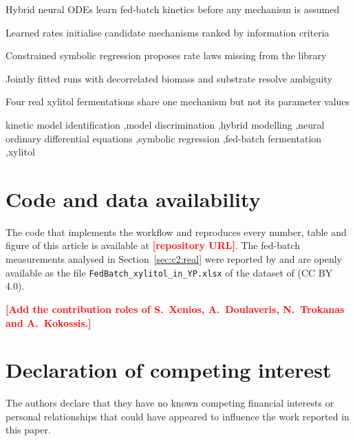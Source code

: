 \documentclass[a4paper,fleqn]{cas-dc}
\newcommand{\todo}[1]{\textcolor{red}{\textbf{[#1]}}}
\begin{document}
\begin{highlights}
\item Hybrid neural ODEs learn fed-batch kinetics before any mechanism is assumed
\item Learned rates initialise candidate mechanisms ranked by information criteria
\item Constrained symbolic regression proposes rate laws missing from the library
\item Jointly fitted runs with decorrelated biomass and substrate resolve ambiguity
\item Four real xylitol fermentations share one mechanism but not its parameter values
\end{highlights}

\begin{keywords}
kinetic model identification \sep model discrimination \sep hybrid modelling \sep neural ordinary differential equations \sep symbolic regression \sep fed-batch fermentation \sep xylitol
\end{keywords}

\maketitle









\section*{Code and data availability}
The code that implements the workflow and reproduces every number, table and figure of this article is available at \todo{repository URL}. The fed-batch measurements analysed in Section~\ref{sec:c2:real} were reported by \citet{Toivari2025} and are openly available as the file \texttt{FedBatch\_xylitol\_in\_YP.xlsx} of the dataset of \citet{ToivariData2025} (CC BY 4.0).

\printcredits
\todo{Add the contribution roles of S.~Xenios, A.~Doulaveris, N.~Trokanas and A.~Kokossis.}

\section*{Declaration of competing interest}
The authors declare that they have no known competing financial interests or personal relationships that could have appeared to influence the work reported in this paper.
\end{document}

